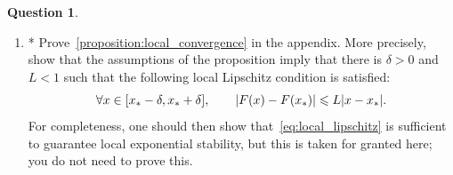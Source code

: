 \documentclass[10pt]{article}
\theoremstyle{definition}
\newtheorem{question}{Question}
\theoremstyle{remark}
\theoremstyle{plain}%
\begin{document}
\begin{question}
\begin{enumerate}
        \item
            *
            Prove~\cref{proposition:local_convergence} in the appendix.
            More precisely, show that the assumptions of the proposition imply that there is $\delta > 0$ and $L < 1$ such that the following local Lipschitz condition is satisfied:
            \begin{equation}
                \label{eq:local_lipschitz}
                \forall x \in [x_* - \delta, x_* + \delta],
                \qquad
                \lvert F(x) - F(x_*) \rvert \leqslant L \lvert x - x_*\rvert.
            \end{equation}
            For completeness, one should then show that~\eqref{eq:local_lipschitz} is sufficient to guarantee local exponential stability,
            but this is taken for granted here; you do not need to prove this.
    \end{enumerate}
\end{question}

\newpage

\newpage
\end{document}
